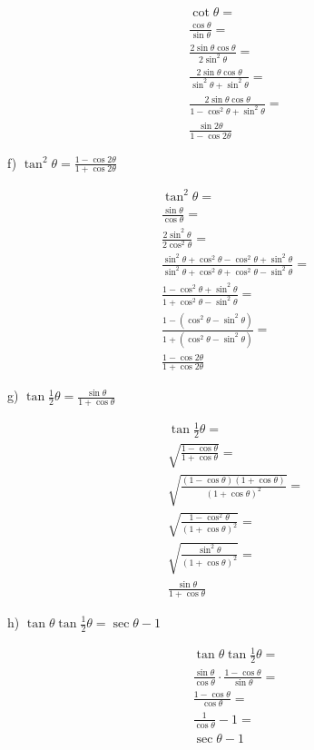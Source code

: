 \documentclass[]{report}
\begin{document}
\begin{align*}
\cot\theta = \\
\frac{\cos\theta}{\sin\theta} = \\
\frac{2\sin\theta\cos\theta}{2\sin^2\theta} = \\
\frac{2\sin\theta\cos\theta}{\sin^2\theta + \sin^2\theta} = \\
\frac{2\sin\theta\cos\theta}{1 - \cos^2\theta + \sin^2\theta} = \\
\frac{\sin2\theta}{1 - \cos2\theta}
\end{align*}

f) $\tan^2 \theta =\frac{1 - \cos2\theta}{1 + \cos2\theta}$

\begin{align*}
\tan^2\theta = \\
\frac{\sin\theta}{\cos\theta} = \\
\frac{2\sin^2\theta}{2\cos^2\theta} = \\
\frac{\sin^2\theta + \cos^2\theta - \cos^2\theta + \sin^2\theta}{\sin^2\theta + \cos^2\theta + \cos^2\theta - \sin^2\theta} = \\
\frac{1 - \cos^2\theta + \sin^2\theta}{1 + \cos^2\theta - \sin^2\theta} = \\
\frac{1 - (\cos^2\theta - \sin^2\theta)}{1 + (\cos^2\theta - \sin^2\theta)} = \\
\frac{1 - \cos2\theta}{1 + \cos2\theta}
\end{align*}

g) $\tan\frac{1}{2} \theta =\frac{\sin\theta}{1 + \cos\theta}$

\begin{align*}
\tan\frac{1}{2} \theta = \\
\sqrt{\frac{1 - \cos\theta}{1 + \cos\theta}} = \\
\sqrt{\frac{(1 - \cos\theta)(1 + \cos\theta)}{(1 + \cos\theta)^2}} = \\
\sqrt{\frac{1 - \cos^2\theta}{(1 + \cos\theta)^2}} = \\
\sqrt{\frac{\sin^2\theta}{(1 + \cos\theta)^2}} = \\
\frac{\sin\theta}{1 + \cos\theta}
\end{align*}

h) $\tan\theta\tan\frac{1}{2}\theta =\sec\theta - 1$

\begin{align*}
\tan\theta\tan\frac{1}{2}\theta = \\
\frac{\sin\theta}{\cos\theta}\cdot \frac{1 - \cos\theta}{\sin\theta} = \\
\frac{1-\cos\theta}{\cos\theta} = \\
\frac{1}{\cos\theta} - 1 = \\
\sec\theta - 1
\end{align*}
\end{document}
